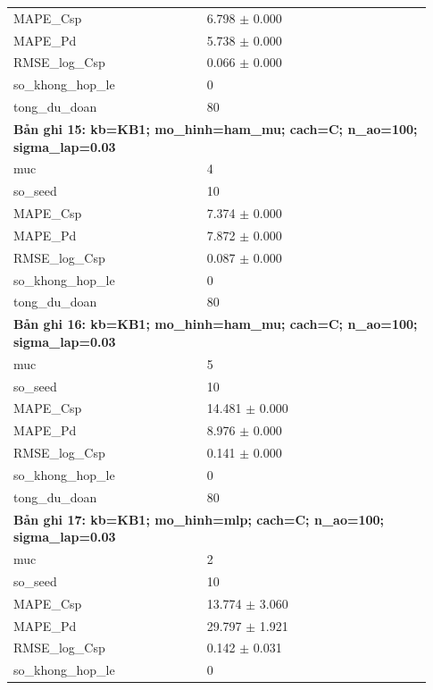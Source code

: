 \begin{longtable}{p{0.43\linewidth}p{0.50\linewidth}}
MAPE\_\allowbreak Csp & 6.798 $\pm$ 0.000 \\
MAPE\_\allowbreak Pd & 5.738 $\pm$ 0.000 \\
RMSE\_\allowbreak log\_\allowbreak Csp & 0.066 $\pm$ 0.000 \\
so\_\allowbreak khong\_\allowbreak hop\_\allowbreak le & 0 \\
tong\_\allowbreak du\_\allowbreak doan & 80 \\
\midrule
\multicolumn{2}{p{0.95\linewidth}}{\textbf{Bản ghi 15: kb=KB1; mo\_hinh=ham\_mu; cach=C; n\_ao=100; sigma\_lap=0.03}} \\
muc & 4 \\
so\_\allowbreak seed & 10 \\
MAPE\_\allowbreak Csp & 7.374 $\pm$ 0.000 \\
MAPE\_\allowbreak Pd & 7.872 $\pm$ 0.000 \\
RMSE\_\allowbreak log\_\allowbreak Csp & 0.087 $\pm$ 0.000 \\
so\_\allowbreak khong\_\allowbreak hop\_\allowbreak le & 0 \\
tong\_\allowbreak du\_\allowbreak doan & 80 \\
\midrule
\multicolumn{2}{p{0.95\linewidth}}{\textbf{Bản ghi 16: kb=KB1; mo\_hinh=ham\_mu; cach=C; n\_ao=100; sigma\_lap=0.03}} \\
muc & 5 \\
so\_\allowbreak seed & 10 \\
MAPE\_\allowbreak Csp & 14.481 $\pm$ 0.000 \\
MAPE\_\allowbreak Pd & 8.976 $\pm$ 0.000 \\
RMSE\_\allowbreak log\_\allowbreak Csp & 0.141 $\pm$ 0.000 \\
so\_\allowbreak khong\_\allowbreak hop\_\allowbreak le & 0 \\
tong\_\allowbreak du\_\allowbreak doan & 80 \\
\midrule
\multicolumn{2}{p{0.95\linewidth}}{\textbf{Bản ghi 17: kb=KB1; mo\_hinh=mlp; cach=C; n\_ao=100; sigma\_lap=0.03}} \\
muc & 2 \\
so\_\allowbreak seed & 10 \\
MAPE\_\allowbreak Csp & 13.774 $\pm$ 3.060 \\
MAPE\_\allowbreak Pd & 29.797 $\pm$ 1.921 \\
RMSE\_\allowbreak log\_\allowbreak Csp & 0.142 $\pm$ 0.031 \\
so\_\allowbreak khong\_\allowbreak hop\_\allowbreak le & 0 \\

\end{longtable}
